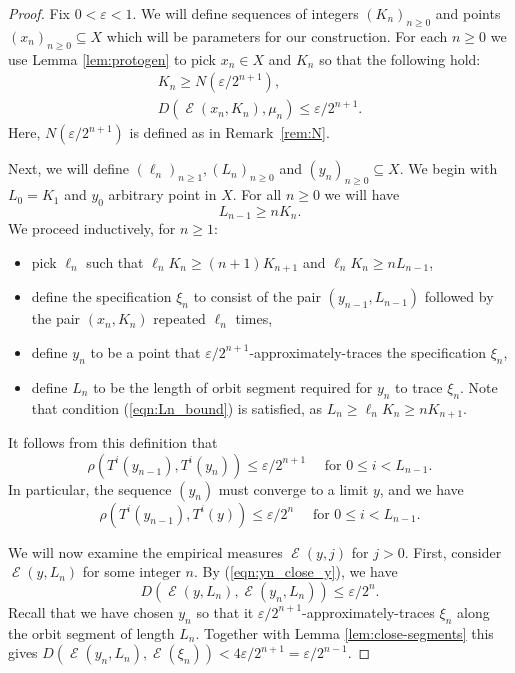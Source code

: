 \documentclass[10pt,a4paper]{amsart}
\DeclareMathOperator{\Emp}{\mathcal{E}}%
\newcommand{\eps}{\varepsilon}
\begin{document}
\begin{proof}
Fix $0< \eps < 1$.
We will define sequences of integers $(K_n)_{n\ge 0}$ and points
$(x_n)_{n\ge 0} \subseteq X$ which will be parameters for our construction. For each $n\ge 0$ we use Lemma \ref{lem:protogen}
to pick $x_n \in X$ and $K_n$
so that the following hold:
\begin{gather}
 K_n\ge N(\eps/2^{n+1}), \label{eqn:cond-x}\\
  D(\Emp(x_n,K_n),\mu_n) \le \eps/2^{n+1}.  \label{eqn:cond-i}
\end{gather}
Here, $N(\eps/2^{n+1})$ is defined as in Remark~\ref{rem:N}. %

Next, we will define $(\ell_n)_{n\ge 1}, (L_n)_{n \ge 0}$ and $(y_n)_{n \ge 0} \subseteq X$. We begin with $L_0 = K_1$ and $y_0$ arbitrary point in $X$. For all $n \ge 0$ we will have
\begin{equation} \label{eqn:Ln_bound}
L_{n-1} \ge n K_n.
\end{equation}
We proceed inductively, for $n \ge 1$:
\begin{itemize}
  \item pick $\ell_n$ such that $\ell_n K_n \ge (n + 1) K_{n+1}$ and $\ell_n K_n \ge n L_{n-1}$,
  \item define the specification $\xi_n$ to consist of the pair $(y_{n-1}, L_{n-1})$ followed by the pair $(x_n, K_n)$ repeated $\ell_n$ times,
  \item define $y_n$ to be a point that $\eps/2^{n+1}$-approximately-traces the specification $\xi_n$,
  \item define $L_n$ to be the length of orbit segment required for $y_n$ to trace $\xi_n$. Note that condition (\ref{eqn:Ln_bound}) is satisfied, as $L_n \ge \ell_n K_n \ge n K_{n+1}$.
\end{itemize}
It follows from this definition that
\begin{equation}
\rho(T^i(y_{n-1}), T^i(y_n)) \le \eps / 2^{n+1} \quad \textrm{ for } 0 \le i < L_{n-1}.
\end{equation}
In particular, the sequence $(y_n)$ must converge to a limit $y$, and we have
\begin{equation} \label{eqn:yn_close_y}
\rho(T^i(y_{n-1}), T^i(y)) \le \eps / 2^n \quad \textrm{ for } 0 \le i < L_{n-1}.
\end{equation}

We will now examine the empirical measures $\Emp(y, j)$ for $j>0$. First, consider $\Emp(y, L_n)$ for some integer $n$. By (\ref{eqn:yn_close_y}), we have
\begin{equation} \label{eqn:item1}
D(\Emp(y, L_n), \Emp(y_n, L_n)) \le \eps / 2^n.
\end{equation}
Recall that we have chosen $y_n$ so that it $\eps/2^{n+1}$-approximately-traces $\xi_n$ along the orbit segment of length $L_n$. Together with Lemma \ref{lem:close-segments} this gives $D(\Emp(y_n, L_n), \Emp(\xi_n)) < 4 \eps/2^{n+1} = \eps / 2^{n-1}$.


\end{proof}
\end{document}
